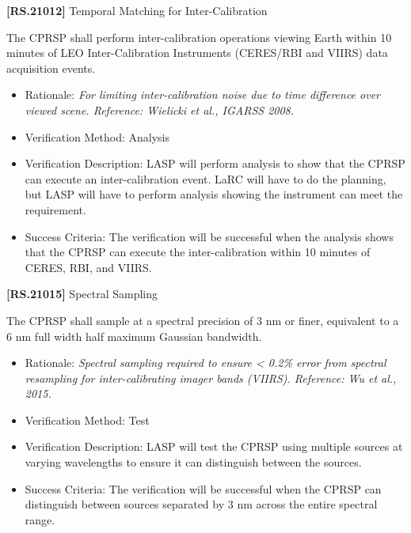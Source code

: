 \textbf{[RS.21012]} Temporal Matching for Inter-Calibration

The \gls{CPRSP} shall perform inter-calibration operations viewing Earth within 10 minutes of \gls{LEO} Inter-Calibration Instruments (CERES\slash RBI and VIIRS) data acquisition events.

\begin{itemize}
\item{} Rationale: \emph{For limiting inter-calibration noise due to time difference over viewed scene. Reference: Wielicki et al., IGARSS 2008.}

\item{} Verification Method: Analysis

\item{} Verification Description: \gls{LASP} will perform \gls{analysis} to show that the \gls{CPRSP} can execute an inter-calibration event. \gls{LaRC} will have to do the planning, but \gls{LASP} will have to perform \gls{analysis} showing the instrument can meet the requirement.

\item{} Success Criteria: The verification will be successful when the \gls{analysis} shows that the \gls{CPRSP} can execute the inter-calibration within 10 minutes of \gls{CERES}, \gls{RBI}, and \gls{VIIRS}.

\end{itemize}

\textbf{[RS.21015]} Spectral Sampling

The \gls{CPRSP} shall \gls{sample} at a spectral precision of 3 nm or finer, equivalent to a 6 nm full width half maximum Gaussian bandwidth.

\begin{itemize}
\item{} Rationale: \emph{Spectral sampling required to ensure < 0.2\% error from spectral resampling for inter-calibrating imager bands (VIIRS). Reference: Wu et al., 2015.}

\item{} Verification Method: Test

\item{} Verification Description: \gls{LASP} will \gls{test} the \gls{CPRSP} using multiple sources at varying wavelengths to ensure it can distinguish between the sources.

\item{} Success Criteria: The verification will be successful when the \gls{CPRSP} can distinguish between sources separated by 3 nm across the entire spectral range.

\end{itemize}

